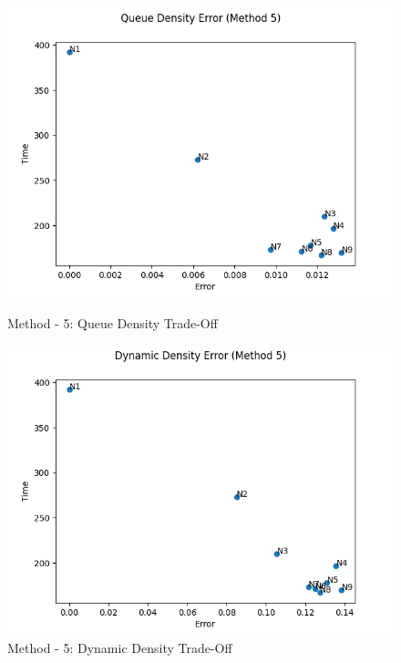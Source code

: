 \documentclass[paper=a4, fontsize = 12pt]{scrartcl}
\numberwithin{equation}{section}		%
\numberwithin{figure}{section}			%
\numberwithin{table}{section}				%
\begin{document}
\begin{figure}[H]
    \centering
    \captionsetup{justification=centering,margin=2cm}
    \includegraphics[width = 15cm]{method5_tradeoff_queue.png}
    \caption{Method - 5: Queue Density Trade-Off}
    \label{fig:M5QueueTradeOff}
    
    \includegraphics[width = 15cm]{method5_tradeoff_dynamic.png}
    \caption{Method - 5: Dynamic Density Trade-Off}
    \label{fig:M5DynamicTradeOff}
\end{figure}
\end{document}
